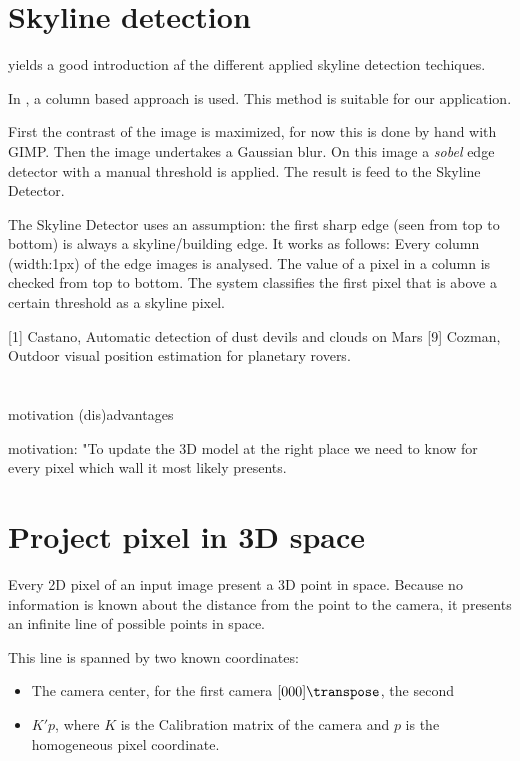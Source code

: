 \section{Skyline detection}
\cite{9} yields a good introduction af the different applied skyline detection
techiques.

In \cite{1}, a column based approach is used. This method is suitable for our
application.

First the contrast of the image is maximized, for now this is done by hand with
GIMP.  Then the image undertakes a Gaussian blur.  On this image a
\textit{sobel} edge detector with a manual threshold is applied.
The result is feed to the Skyline Detector.

The Skyline Detector uses an assumption: the first sharp edge (seen from top to
bottom) is always a skyline/building edge.  It works as follows:
Every column (width:1px) of the edge images is analysed. The value of a pixel
in a column is checked from top to bottom. The system classifies the first
pixel that is above a certain threshold as a skyline pixel.

[1] Castano, Automatic detection of dust devils and clouds on Mars
[9] Cozman, Outdoor visual position estimation for planetary rovers.



\section{}
motivation
(dis)advantages

motivation:
"To update the 3D model at the right place we need to know for every pixel 
which wall it most likely presents.  

\section{Project pixel in 3D space}
Every 2D pixel of an input image present a 3D point in space. Because no
information is known about the distance from the point to the camera, it
presents an infinite line of possible points in space.


This line is spanned by two known coordinates:
\begin{itemize}
\item The camera center, for the first camera $[0 0 0]\transpose$, the second %
\item $K'p$, where $K$ is the Calibration matrix of the camera and $p$ is the homogeneous pixel coordinate.
\end{itemize}


